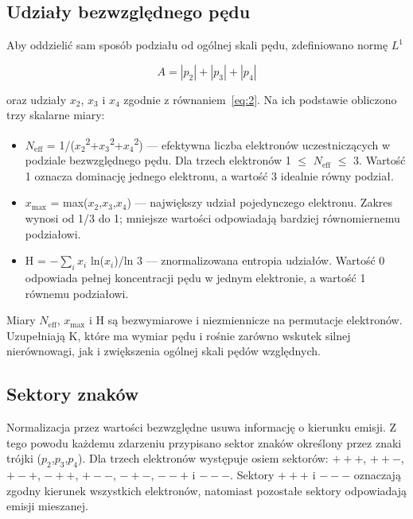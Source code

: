 \documentclass[12pt,letterpaper,oneside]{report}
\numberwithin{equation}{chapter}
\numberwithin{figure}{chapter}
\numberwithin{table}{chapter}
\newcommand{\Neff}{\ensuremath{N_{\mathrm{eff}}}}
\newcommand{\xmax}{\ensuremath{x_{\max}}}
\begin{document}
\subsection{Udziały bezwzględnego pędu}

Aby oddzielić sam sposób podziału od ogólnej skali pędu, zdefiniowano
normę \ensuremath{L^1}

\begin{equation}
A=|p_2|+|p_3|+|p_4|
\label{eq:17}
\end{equation}

oraz udziały \ensuremath{x_2}, \ensuremath{x_3} i \ensuremath{x_4} zgodnie z równaniem~\eqref{eq:2}. Na ich podstawie
obliczono trzy skalarne miary:

\begin{itemize}
\item
  \Neff{} = 1/(\ensuremath{x_2}\textsuperscript{2}+\ensuremath{x_3}\textsuperscript{2}+\ensuremath{x_4}\textsuperscript{2}) --- efektywna liczba elektronów
  uczestniczących w podziale bezwzględnego pędu. Dla trzech elektronów 1
  \ensuremath{\leq} \Neff{} \ensuremath{\leq} 3. Wartość 1 oznacza dominację jednego elektronu, a wartość
  3 idealnie równy podział.
\item
  \xmax{} = max(\ensuremath{x_2},\ensuremath{x_3},\ensuremath{x_4}) --- największy udział pojedynczego elektronu.
  Zakres wynosi od 1/3 do 1; mniejsze wartości odpowiadają bardziej
  równomiernemu podziałowi.
\item
  H = \ensuremath{-}\ensuremath{\sum_i}\ensuremath{x_i} ln(\ensuremath{x_i})/ln 3 --- znormalizowana entropia udziałów. Wartość 0
  odpowiada pełnej koncentracji pędu w jednym elektronie, a wartość 1
  równemu podziałowi.
\end{itemize}

Miary \Neff{}, \xmax{} i H są bezwymiarowe i niezmiennicze na permutacje
elektronów. Uzupełniają K, które ma wymiar pędu i rośnie zarówno wskutek
silnej nierównowagi, jak i zwiększenia ogólnej skali pędów względnych.

\subsection{Sektory znaków}

Normalizacja przez wartości bezwzględne usuwa informację o kierunku
emisji. Z tego powodu każdemu zdarzeniu przypisano sektor znaków
określony przez znaki trójki (\ensuremath{p_2},\ensuremath{p_3},\ensuremath{p_4}). Dla trzech elektronów występuje
osiem sektorów: \ensuremath{+++}, \ensuremath{++-}, \ensuremath{+-+}, \ensuremath{-++}, \ensuremath{+--}, \ensuremath{-+-}, \ensuremath{--+} i \ensuremath{---}. Sektory \ensuremath{+++} i
\ensuremath{---} oznaczają zgodny kierunek wszystkich elektronów, natomiast pozostałe
sektory odpowiadają emisji mieszanej.
\end{document}

